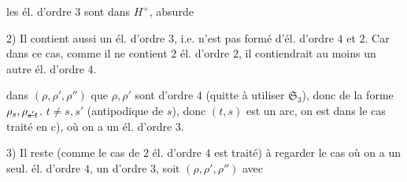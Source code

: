  les él. d'ordre $3$ sont dans $H^{+}$, absurde

2) Il contient aussi un él. d'ordre $3$, i.e. n'est pas formé  d'él. d'ordre $4$ et $2$. Car dans ce cas, comme il ne contient $2$ él. d'ordre $2$, il contiendrait au moins un autre él. d'ordre $4$.

  dans $(\rho,\rho',\rho'')$ que $\rho,\rho'$ sont d'ordre $4$ (quitte à utiliser $\mathfrak S_3$), donc de la forme $\rho_s,\rho_{\deleted{s'}t}$.    $t\ne s,s'$ (antipodique de $s$), donc $(t,s)$ est un arc, on est dans le cas traité en c), où on a un él. d'ordre $3$.

3) Il reste (comme le cas de $2$ él. d'ordre $4$ est traité) à regarder le cas où on a un seul. él. d'ordre $4$, un d'ordre $3$, soit $(\rho,\rho',\rho'')$ avec

